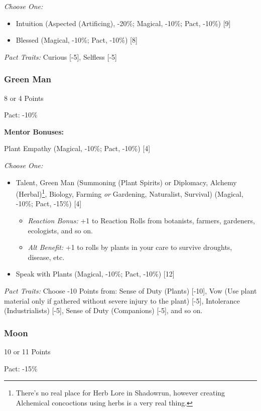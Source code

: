\begin{multicols}{3}
	\textit{Choose One:}
	\begin{itemize}
		\itemsep 0pt
		\item Intuition (Aspected (Artificing), -20\%; Magical, -10\%; Pact, -10\%) [9]
		\item Blessed (Magical, -10\%; Pact, -10\%) [8]
	\end{itemize}
	
	\textit{Pact Traits:} Curious [-5], Selfless [-5]
	
	\subsubsection{Green Man}
	\begin{flushright}
		8 or 4 Points
	\end{flushright}
	Pact: -10\%
	
	
	\textbf{Mentor Bonuses:} 
	
	Plant Empathy (Magical, -10\%; Pact, -10\%) [4]
	
	\textit{Choose One:}
	\begin{itemize}
		\itemsep 0pt
		\item Talent, Green Man (Summoning (Plant Spirits) or Diplomacy, Alchemy (Herbal)\footnote{There's no real place for Herb Lore in Shadowrun, however creating Alchemical concoctions using herbs is a very real thing.}, Biology, Farming \textit{or} Gardening, Naturalist, Survival) (Magical, -10\%; Pact, -15\%) [4]
		\begin{itemize}
			\itemsep 0pt
			\item \textit{Reaction Bonus:} +1 to Reaction Rolls from botanists, farmers, gardeners, ecologists, and so on.
			\item \textit{Alt Benefit:} +1 to rolls by plants in your care to survive droughts, disease, etc.
		\end{itemize}
		\item Speak with Plants (Magical, -10\%; Pact, -10\%) [12]
	\end{itemize}
	
	\textit{Pact Traits:} Choose -10 Points from: Sense of Duty (Plants) [-10], Vow (Use plant material only if gathered without severe injury to the plant) [-5], Intolerance (Industrialists) [-5], Sense of Duty (Companions) [-5], and so on.
		
	\subsubsection{Moon}
	\begin{flushright}
		10 or 11 Points
	\end{flushright}
	Pact: -15\%
	

\end{multicols}
